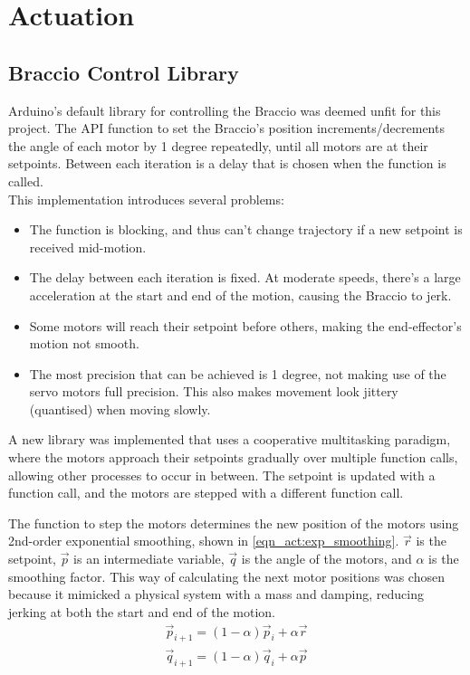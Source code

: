 \chapter{Actuation}\label{ch:act}

\section{Braccio Control Library}

Arduino's default library for controlling the Braccio \cite{bib:Braccio} was deemed unfit for this project. The API function to set the Braccio's position increments/decrements the angle of each motor by 1 degree repeatedly, until all motors are at their setpoints. Between each iteration is a delay that is chosen when the function is called.\\
This implementation introduces several problems:
\begin{itemize}[nosep]
    \item The function is blocking, and thus can't change trajectory if a new setpoint is received mid-motion.
    \item The delay between each iteration is fixed. At moderate speeds, there's a large acceleration at the start and end of the motion, causing the Braccio to jerk.
    \item Some motors will reach their setpoint before others, making the end-effector's motion not smooth.
    \item The most precision that can be achieved is 1 degree, not making use of the servo motors full precision. This also makes movement look jittery (quantised) when moving slowly.
\end{itemize}

A new library was implemented that uses a cooperative multitasking paradigm, where the motors approach their setpoints gradually over multiple function calls, allowing other processes to occur in between. The setpoint is updated with a function call, and the motors are stepped with a different function call.

The function to step the motors determines the new position of the motors using 2nd-order exponential smoothing, shown in \autoref{eqn_act:exp_smoothing}. $\vec{r}$ is the setpoint, $\vec{p}$ is an intermediate variable, $\vec{q}$ is the angle of the motors, and $\alpha$ is the smoothing factor. This way of calculating the next motor positions was chosen because it mimicked a physical system with a mass and damping, reducing jerking at both the start and end of the motion.
\begin{equation}
\begin{split}
    \vec{p}_{i+1}=(1-\alpha)\vec{p}_i+\alpha\vec{r}\\
    \vec{q}_{i+1}=(1-\alpha)\vec{q}_i+\alpha\vec{p}
    \label{eqn_act:exp_smoothing}
\end{split}
\end{equation}

